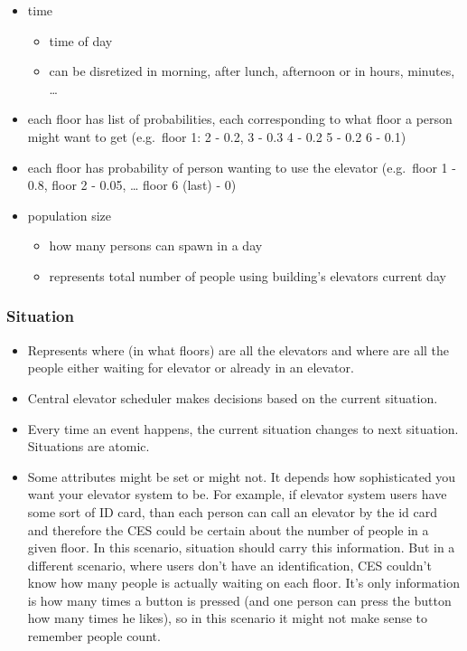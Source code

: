 \begin{itemize}
\item
  time

  \begin{itemize}
  \tightlist
  \item
    time of day
  \item
    can be disretized in morning, after lunch, afternoon or in hours,
    minutes, \ldots{}
  \end{itemize}
\item
  each floor has list of probabilities, each corresponding to what floor
  a person might want to get (e.g.~floor 1: 2 - 0.2, 3 - 0.3 4 - 0.2 5 -
  0.2 6 - 0.1)
\item
  each floor has probability of person wanting to use the elevator
  (e.g.~floor 1 - 0.8, floor 2 - 0.05, \ldots{} floor 6 (last) - 0)
\item
  population size

  \begin{itemize}
  \tightlist
  \item
    how many persons can spawn in a day
  \item
    represents total number of people using building's elevators current
    day
  \end{itemize}
\end{itemize}

\hypertarget{situation}{%
\subsubsection{\texorpdfstring{\textbf{Situation}}{Situation}}\label{situation}}

\begin{itemize}
\tightlist
\item
  Represents where (in what floors) are all the elevators and where are
  all the people either waiting for elevator or already in an elevator.
\item
  Central elevator scheduler makes decisions based on the current
  situation.
\item
  Every time an event happens, the current situation changes to next
  situation. Situations are atomic.
\item
  Some attributes might be set or might not. It depends how
  sophisticated you want your elevator system to be. For example, if
  elevator system users have some sort of ID card, than each person can
  call an elevator by the id card and therefore the CES could be certain
  about the number of people in a given floor. In this scenario,
  situation should carry this information. But in a different scenario,
  where users don't have an identification, CES couldn't know how many
  people is actually waiting on each floor. It's only information is how
  many times a button is pressed (and one person can press the button
  how many times he likes), so in this scenario it might not make sense
  to remember people count.
\end{itemize}

